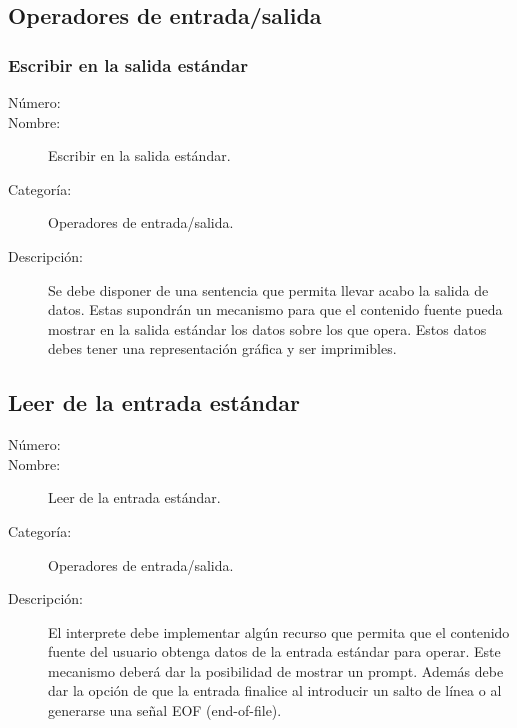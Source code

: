 \subsection{Operadores de entrada/salida}

\subsubsection{Escribir en la salida estándar}
\begin{framed}
	\begin{description}
		\item [Número:] \cn
		\item [Nombre:] Escribir en la salida estándar.
		\item [Categoría:] Operadores de entrada/salida.
		\item [Descripción:] Se debe disponer de una sentencia que permita llevar acabo la salida de datos. Estas supondrán un mecanismo para
		que el contenido fuente pueda mostrar en la salida estándar los datos sobre los que opera. Estos datos
		debes tener una representación gráfica y ser imprimibles.  
	\end {description}
\end{framed}

\subsection{Leer de la entrada estándar}
\begin{framed}
	\begin{description}
		\item [Número:] \cn
		\item [Nombre:] Leer de la entrada estándar.
		\item [Categoría:] Operadores de entrada/salida.
		\item [Descripción:] El interprete debe implementar algún recurso que permita que el contenido fuente del usuario
		obtenga datos de la entrada estándar para operar. Este mecanismo deberá dar la posibilidad de mostrar un prompt.
		Además debe dar la opción de que la entrada finalice al introducir un salto de línea o al
		generarse una señal EOF (end-of-file).
	\end {description}
\end{framed}
